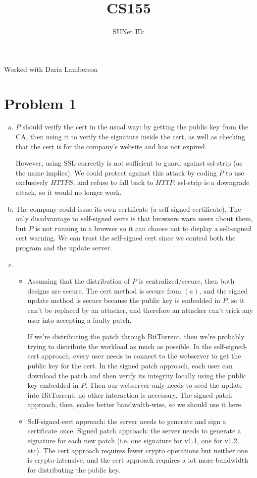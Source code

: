 \documentclass{article}
\title{CS155 \exerciseset}
\author{\studentname \qquad SUNet ID: \suid}
\begin{document}
\maketitle

Worked with Daria Lamberson

\section*{Problem 1}
\begin{enumerate}[(a)]
\item $P$ should verify the cert in the usual way: by getting the public key from the CA, then using it to verify the signature inside the cert, as well as checking that the cert is for the company's website and has not expired.

However, using SSL correctly is not sufficient to guard against ssl-strip (as the name implies). We could protect against this attack by coding $P$ to use exclusively $HTTPS$, and refuse to fall back to $HTTP$. ssl-strip is a downgrade attack, so it would no longer work.

\item The company could issue its own certificate (a self-signed certificate). The only disadvantage to self-signed certs is that browsers warn users about them, but $P$ is not running in a browser so it can choose not to display a self-signed cert warning. We can trust the self-signed cert since we control both the program and the update server.

\item 
\begin{itemize}
\item Assuming that the distribution of $P$ is centralized/secure, then both designs are secure. The cert method is secure from $(a)$, and the signed update method is secure because the public key is embedded in $P$, so it can't be replaced by an attacker, and therefore an attacker can't trick any user into accepting a faulty patch.

 If we're distributing the patch through BitTorrent, then we're probably trying to distribute the workload as much as possible. In the self-signed-cert approach, every user needs to connect to the webserver to get the public key for the cert. In the signed patch approach, each user can download the patch and then verify its integrity locally using the public key embedded in $P$. Then our webserver only needs to seed the update into BitTorrent; no other interaction is necessary. The signed patch approach, then, scales better bandwidth-wise, so we should use it here.

\item Self-signed-cert approach: the server needs to generate and sign a certificate once. Signed patch approach: the server needs to generate a signature for each new patch (i.e. one signature for v1.1, one for v1.2, etc). The cert approach requires fewer crypto operations but neither one is crypto-intensive, and the cert approach requires a lot more bandwidth for distributing the public key. 
\end{itemize}

\end{enumerate}
\end{document}
